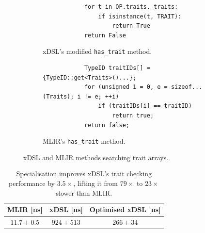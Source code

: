 \begin{figure}[H]
    \centering
    \begin{subfigure}[b]{0.45\textwidth}
       \centering
        \begin{verbatim}
            for t in OP.traits._traits:
                if isinstance(t, TRAIT):
                    return True
            return False
        \end{verbatim}
        \footnotesize\vspace{2em}
        \captionsetup{name=Listing}
        \caption{xDSL's modified \texttt{has_trait} method.}
        \label{listing:ubenchmark-trait-checks-both-xdsl}
    \end{subfigure}
    \hfill
    \begin{subfigure}[b]{0.45\textwidth}
        \centering
        \begin{verbatim}
            TypeID traitIDs[] = {TypeID::get<Traits>()...};
            for (unsigned i = 0, e = sizeof...(Traits); i != e; ++i)
                if (traitIDs[i] == traitID)
                    return true;
            return false;
        \end{verbatim}
        \captionsetup{name=Listing}
        \caption{MLIR's \texttt{has_trait} method.}
        \label{listing:ubenchmark-trait-checks-both-mlir}
    \end{subfigure}
    \vspace{1em}
    \captionsetup{name=Listing}
    \caption{xDSL and MLIR methods searching trait arrays.}
    \label{listing:ubenchmark-trait-checks-both}
\end{figure}



\begin{table}[H]
  \caption{Specialisation improves xDSL's trait checking performance by $3.5\times$, lifting it from $79\times$ to $23\times$ slower than MLIR.}
  \label{tab:ubenchmark-trait-checks-optimised}
  \centering
  \begin{tabular}{ccc}
    \toprule
    \textbf{MLIR [ns]} & \textbf{xDSL [ns]} & \textbf{Optimised xDSL [ns]} \\
    \midrule
    $11.7 \pm 0.5$ & $924 \pm 513$ & $266 \pm 34$\\
    \bottomrule
  \end{tabular}
\end{table}


